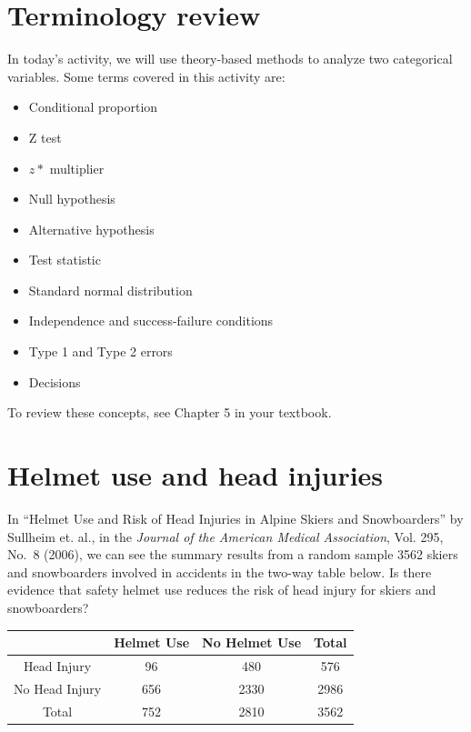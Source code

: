 \documentclass[
]{report}
\begin{document}
\hypertarget{terminology-review}{%
\section{Terminology review}\label{terminology-review}}

In today's activity, we will use theory-based methods to analyze two categorical variables. Some terms covered in this activity are:

\begin{itemize}
\item
  Conditional proportion
\item
  Z test
\item
  \(z*\) multiplier
\item
  Null hypothesis
\item
  Alternative hypothesis
\item
  Test statistic
\item
  Standard normal distribution
\item
  Independence and success-failure conditions
\item
  Type 1 and Type 2 errors
\item
  Decisions
\end{itemize}

To review these concepts, see Chapter 5 in your textbook.

\newpage

\hypertarget{helmet-use-and-head-injuries}{%
\section{Helmet use and head injuries}\label{helmet-use-and-head-injuries}}

In ``Helmet Use and Risk of Head Injuries in Alpine Skiers and Snowboarders'' by Sullheim et. al., in the \emph{Journal of the American Medical Association}, Vol. 295, No.~8 (2006), we can see the summary results from a random sample 3562 skiers and snowboarders involved in accidents in the two-way table below. Is there evidence that safety helmet use reduces the risk of head injury for skiers and snowboarders?

\begin{longtable}[]{@{}cccc@{}}
\toprule
& Helmet Use & No Helmet Use & Total\tabularnewline
\midrule
\endhead
Head Injury & 96 & 480 & 576\tabularnewline
No Head Injury & 656 & 2330 & 2986\tabularnewline
Total & 752 & 2810 & 3562\tabularnewline
\bottomrule
\end{longtable}
\end{document}
